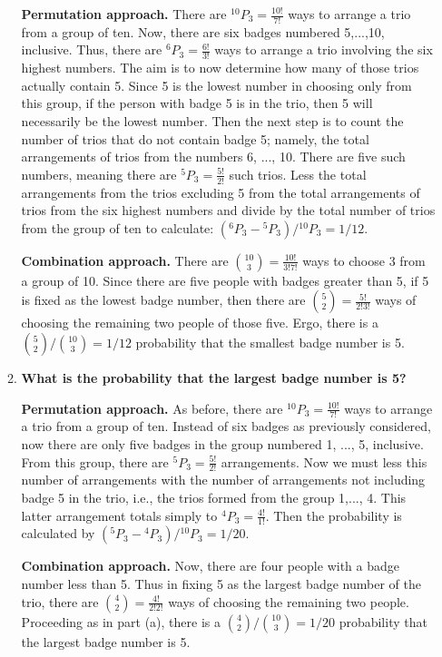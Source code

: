 \documentclass[10pt, oneside]{article}   	%
\newcommand*{\Perm}[2]{{}^{#1}\!P_{#2}}%
\theoremstyle{definition}
\begin{document}
\begin{enumerate}[label=2.\arabic*]
\begin{enumerate}
	\textbf{Permutation approach.} There are $\Perm{10}{3} = \frac{10!}{7!}$ ways to arrange a trio from a group of ten. Now, there are six badges numbered 5,...,10, inclusive. Thus, there are $\Perm{6}{3} = \frac{6!}{3!}$ ways to arrange a trio involving the six highest numbers. The aim is to now determine how many of those trios actually contain 5. Since 5 is the lowest number in choosing only from this group, if the person with badge 5 is in the trio, then 5 will necessarily be the lowest number. Then the next step is to count the number of trios that do not contain badge 5; namely, the total arrangements of trios from the numbers 6, ..., 10. There are five such numbers, meaning there are $\Perm{5}{3} = \frac{5!}{2!}$ such trios. Less the total arrangements from the trios excluding 5 from the total arrangements of trios from the six highest numbers and divide by the total number of trios from the group of ten to calculate: $(\Perm{6}{3} - \Perm{5}{3}) / \Perm{10}{3} = \boxed{1/12}$.
	
	\textbf{Combination approach.} There are $\binom {10}{3} = \frac{10!}{3!7!}$ ways to choose 3 from a group of 10. Since there are five people with badges greater than 5, if 5 is fixed as the lowest badge number, then there are $\binom 52 = \frac{5!}{2! 3!}$ ways of choosing the remaining two people of those five. Ergo, there is a $\binom{5}{2} / \binom {10}{3} = \boxed{1/12}$ probability that the smallest badge number is 5.
	
	\item \begin{tcolorbox}[
  colback=Cerulean!5!white,
  colframe=Cerulean!75!black]
	\textbf{What is the probability that the largest badge number is 5?}
	\end{tcolorbox}
	
	\textbf{Permutation approach.} As before, there are $\Perm{10}{3} = \frac{10!}{7!}$ ways to arrange a trio from a group of ten. Instead of six badges as previously considered, now there are only five badges in the group numbered 1, ..., 5, inclusive. From this group, there are $\Perm{5}{3} = \frac{5!}{2!}$ arrangements. Now we must less this number of arrangements with the number of arrangements not including badge 5 in the trio, i.e., the trios formed from the group 1,..., 4. This latter arrangement totals simply to $\Perm{4}{3} = \frac{4!}{1!}$. Then the probability is calculated by $(\Perm{5}{3} - \Perm{4}{3}) / \Perm{10}{3} = \boxed{1/20}$. 
	
	\textbf{Combination approach.} Now, there are four people with a badge number less than 5. Thus in fixing 5 as the largest badge number of the trio, there are $\binom 42 = \frac{4!}{2!2!}$ ways of choosing the remaining two people. Proceeding as in part (a), there is a $\binom{4}{2} / \binom {10}{3} = \boxed{1/20}$ probability that the largest badge number is 5.
	

\end{enumerate}
\end{enumerate}
\end{document}
